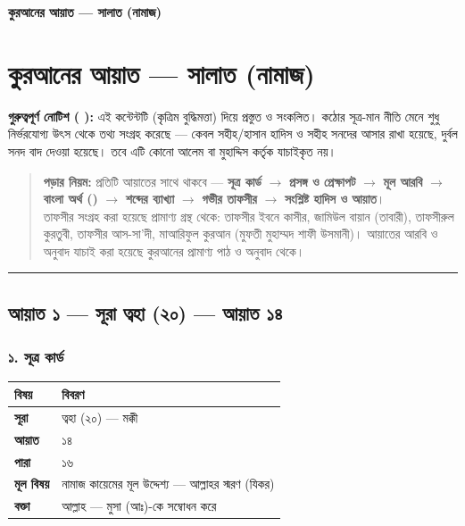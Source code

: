 

\begin{center}{\Large\bfseries\color{emerald} কুরআনের আয়াত — সালাত (নামাজ)}\end{center}
\vspace{1em}
\section*{কুরআনের আয়াত — সালাত (নামাজ)}

\begin{warnbox}
 \textbf{গুরুত্বপূর্ণ নোটিশ ( ):} এই কন্টেন্টটি  (কৃত্রিম বুদ্ধিমত্তা) দিয়ে প্রস্তুত ও সংকলিত।  কঠোর সূত্র-মান নীতি মেনে শুধু নির্ভরযোগ্য উৎস থেকে তথ্য সংগ্রহ করেছে — কেবল সহীহ/হাসান হাদিস ও সহীহ সনদের আসার রাখা হয়েছে, দুর্বল সনদ বাদ দেওয়া হয়েছে। তবে এটি কোনো আলেম বা মুহাদ্দিস কর্তৃক যাচাইকৃত নয়।
\end{warnbox}


\begin{quote}
\textbf{পড়ার নিয়ম:} প্রতিটি আয়াতের সাথে থাকবে — \textbf{সূত্র কার্ড} $\rightarrow$ \textbf{প্রসঙ্গ ও প্রেক্ষাপট} $\rightarrow$ \textbf{মূল আরবি} $\rightarrow$ \textbf{বাংলা অর্থ ()} $\rightarrow$ \textbf{শব্দের ব্যাখ্যা} $\rightarrow$ \textbf{গভীর তাফসীর} $\rightarrow$ \textbf{সংশ্লিষ্ট হাদিস ও আয়াত}। \\
তাফসীর সংগ্রহ করা হয়েছে প্রামাণ্য গ্রন্থ থেকে: তাফসীর ইবনে কাসীর, জামিউল বায়ান (তাবারী), তাফসীরুল কুরতুবী, তাফসীর আস-সা'দী, মাআরিফুল কুরআন (মুফতী মুহাম্মদ শাফী উসমানী)। আয়াতের আরবি ও অনুবাদ যাচাই করা হয়েছে কুরআনের প্রামাণ্য পাঠ ও অনুবাদ থেকে।
\end{quote}


\medskip\hrule\medskip

\subsection*{আয়াত ১ — সূরা ত্বহা (২০) — আয়াত ১৪}

\subsubsection*{১. সূত্র কার্ড}

\begin{table}[h]\centering\small
\begin{tabular}{ll}
বিষয় & বিবরণ \\
\hline
\textbf{সূরা} & ত্বহা (২০) — মক্কী \\
\textbf{আয়াত} & ১৪ \\
\textbf{পারা} & ১৬ \\
\textbf{মূল বিষয়} & নামাজ কায়েমের মূল উদ্দেশ্য — আল্লাহর স্মরণ (যিকর) \\
\textbf{বক্তা} & আল্লাহ — মুসা (আঃ)-কে সম্বোধন করে \\
\hline
\end{tabular}
\end{table}

